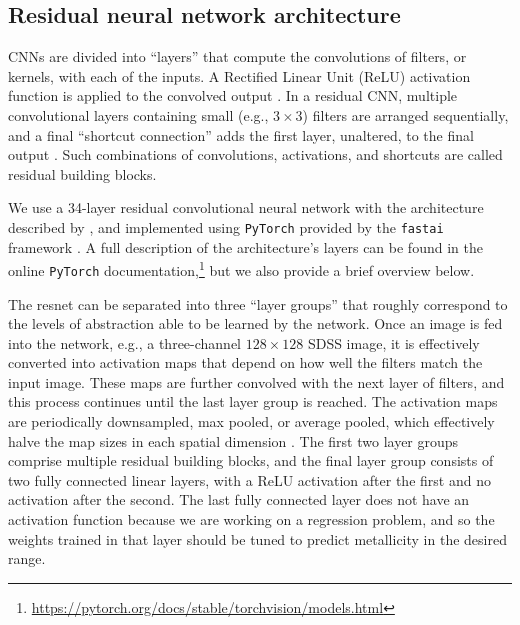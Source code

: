 \documentclass[fleqn,usenatbib]{mnras}
\newcommand{\eg}{e.g.}
\begin{document}
\subsection{Residual neural network architecture}
CNNs are divided into ``layers'' that compute the convolutions of filters, or kernels, with each of the inputs.
A Rectified Linear Unit (ReLU) activation function is applied to the convolved output \citep[ReLUs have been shown to propagate information about the relative importances of different features, and are effective for training deep neural networks;][]{Nair2010}.
In a residual CNN, multiple convolutional layers containing small (e.g., $3\times 3$) filters are arranged sequentially, and a final ``shortcut connection'' adds the first layer, unaltered, to the final output \citep[before the final ReLU activation; see, e.g., Figure~2 of][]{He2015}.
Such combinations of convolutions, activations, and shortcuts are called residual building blocks.

We use a 34-layer residual convolutional neural network with the architecture described by \cite{He2015}, and implemented using \texttt{PyTorch} \citep[version 0.3.1;][]{pytorch} provided by the \texttt{fastai} framework \citep[version 0.7;][]{fastai}.
A full description of the architecture's layers can be found in the online \texttt{PyTorch} documentation,\footnote{\url{https://pytorch.org/docs/stable/torchvision/models.html}} but we also provide a brief overview below.

The resnet can be separated into three ``layer groups'' that roughly correspond to the levels of abstraction able to be learned by the network. Once an image is fed into the network, \eg, a three-channel $128\times 128$ SDSS image, it is effectively converted into activation maps that depend on how well the filters match the input image. These maps are further convolved with the next layer of filters, and this process continues until the last layer group is reached. The activation maps are periodically downsampled, max pooled, or average pooled, which effectively halve the map sizes in each spatial dimension \citep[for more about pooling layers in CNNs, see][]{Scherer2010}. The first two layer groups comprise multiple residual building blocks, and the final layer group consists of two fully connected linear layers, with a ReLU activation after the first and no activation after the second. The last fully connected layer does not have an activation function because we are working on a regression problem, and so the weights trained in that layer should be tuned to predict metallicity in the desired range.
\end{document}
